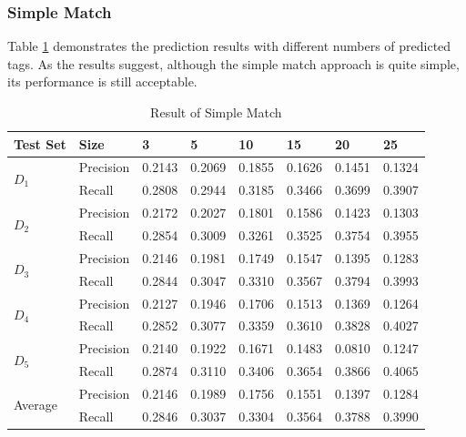 \subsubsection{Simple Match}
Table \ref{tb:nbresult} demonstrates the prediction results with different numbers of predicted tags. As the results suggest, although the simple match approach is quite simple, its performance is still acceptable.

\begin{table}
\centering \caption{\label{tb:nbresult}Result of Simple Match}
\begin{tabular}{l|l|l|l|l|l|l|l}
	\hline Test Set & Size & 3 & 5 & 10 & 15 & 20 & 25 \\
	\hline \multirow{2}{*}{$D_1$} & Precision & 0.2143 & 0.2069 & 0.1855 & 0.1626 & 0.1451 & 0.1324\\
	\cline{2-8} & Recall & 0.2808 & 0.2944 & 0.3185 & 0.3466 & 0.3699 & 0.3907\\
	
	\hline \multirow{2}{*}{$D_2$} & Precision & 0.2172 & 0.2027 & 0.1801 & 0.1586 & 0.1423 & 0.1303\\
	\cline{2-8} & Recall &0.2854 & 0.3009 & 0.3261 & 0.3525 & 0.3754 & 0.3955\\
	
	\hline \multirow{2}{*}{$D_3$} & Precision &0.2146 & 0.1981 & 0.1749 & 0.1547 & 0.1395 & 0.1283\\
	\cline{2-8} & Recall & 0.2844 & 0.3047 & 0.3310 & 0.3567 & 0.3794 & 0.3993\\
	
	\hline \multirow{2}{*}{$D_4$} & Precision & 0.2127 & 0.1946 & 0.1706 & 0.1513 & 0.1369 & 0.1264\\
	\cline{2-8} & Recall & 0.2852 & 0.3077 & 0.3359 & 0.3610 & 0.3828 & 0.4027\\
	
	\hline \multirow{2}{*}{$D_5$} & Precision &0.2140 & 0.1922 & 0.1671 & 0.1483 & 0.0810 & 0.1247\\
	\cline{2-8} & Recall &0.2874 & 0.3110 & 0.3406 & 0.3654 & 0.3866 & 0.4065\\
	
	\hline \multirow{2}{*}{Average} & Precision & 0.2146 & 0.1989 & 0.1756 & 0.1551 & 0.1397 & 0.1284\\
	\cline{2-8} & Recall &0.2846 & 0.3037 & 0.3304 & 0.3564 & 0.3788 & 0.3990\\
	
	\hline
\end{tabular}
\end{table}

